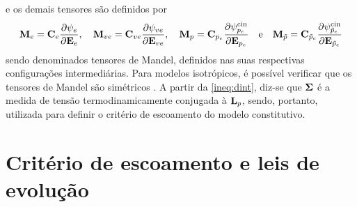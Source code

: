 \documentclass[Tese.tex]{subfiles}
\begin{document}
e os demais tensores são definidos por \begin{equation}
\mathbf{M}_e = \mathbf{C}_e\dfrac{\partial \psi_e}{\partial \mathbf{E}_e},\quad \mathbf{M}_{ve} = \mathbf{C}_{ve}\dfrac{\partial \psi_{ve}}{\partial \mathbf{E}_{ve}},\quad \mathbf{M}_p = \mathbf{C}_{p_e}\dfrac{\partial \psi_{p_e}^\text{cin}}{\partial \mathbf{E}_{p_e}} \quad\text{e}\quad \mathbf{M}_{\tilde{p}} = \mathbf{C}_{\tilde{p}_e}\dfrac{\partial \psi_{\tilde{p}_e}^\text{cin}}{\partial \mathbf{E}_{\tilde{p}_e}} \label{eq:mandel}
\end{equation}
sendo denominados tensores de Mandel, definidos nas suas respectivas configurações intermediárias. Para modelos isotrópicos, é possível verificar que os tensores de Mandel são simétricos \cite{SVENDSEN1998473}. A partir da \cref{ineq:dint}, diz-se que $\boldsymbol{\Sigma}$ é a medida de tensão termodinamicamente conjugada à $\mathbf{L}_p$, sendo, portanto, utilizada para definir o critério de escoamento do modelo constitutivo.

\section{Critério de escoamento e leis de evolução}\label{sec:leis-evolucao}
\end{document}

